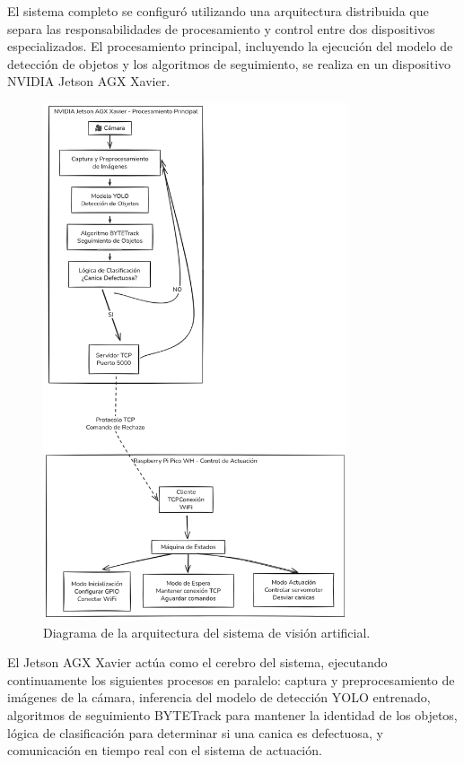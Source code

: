 \documentclass[11pt,spanish,listoffigures,listoftables]{tfgetsinf}
\begin{document}
El sistema completo se configuró utilizando una arquitectura distribuida que separa las responsabilidades de procesamiento y control entre dos dispositivos especializados. El procesamiento principal, incluyendo la ejecución del modelo de detección de objetos y los algoritmos de seguimiento, se realiza en un dispositivo NVIDIA Jetson AGX Xavier.



\begin{figure}[H]
   \centering
   \includegraphics[width=0.8\textwidth]{images/prueba_de_concepto/diagrama_cinta.png}
   \caption[Diagrama de la arquitectura del sistema de visión artificial]{Diagrama de la arquitectura del sistema de visión artificial.}
   \label{fig:diagrama_cinta}
\end{figure}

El Jetson AGX Xavier actúa como el cerebro del sistema, ejecutando continuamente los siguientes procesos en paralelo: captura y preprocesamiento de imágenes de la cámara, inferencia del modelo de detección YOLO entrenado, algoritmos de seguimiento BYTETrack para mantener la identidad de los objetos, lógica de clasificación para determinar si una canica es defectuosa, y comunicación en tiempo real con el sistema de actuación.
\end{document}
